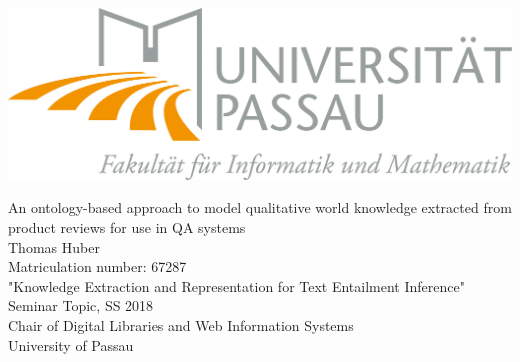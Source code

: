 \thispagestyle{empty}
\includegraphics[scale=0.4, right]{fig/uni-passau}
\mbox{}

\begin{center}
\Huge{An ontology-based approach to model qualitative world knowledge extracted from product reviews for use in QA systems}\\[4pc]

\Large{Thomas Huber}\\[1pc]
\large{Matriculation number: 67287}
\large{}\\[5pc]

"Knowledge Extraction and Representation for Text Entailment Inference" Seminar Topic, SS 2018\\
Chair of Digital Libraries and Web Information Systems\\
University of Passau\\

\end{center}
\vfill
